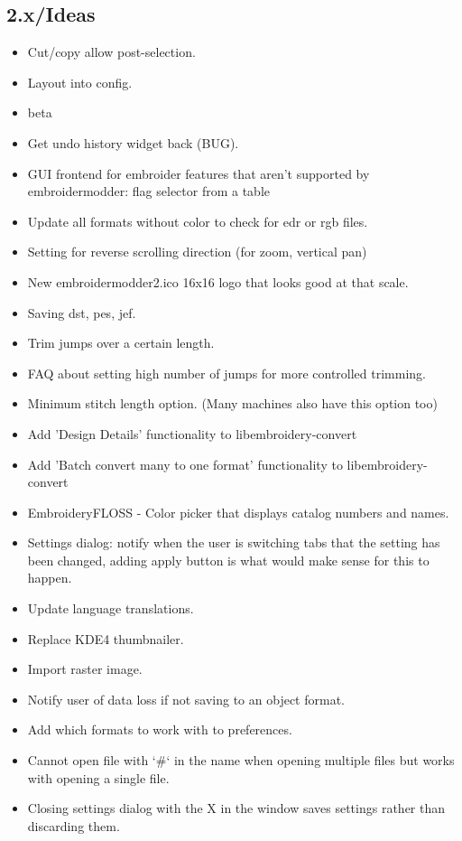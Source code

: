 \subsection{2.x/Ideas}

\begin{itemize}
\item Cut/copy allow post-selection.
\item Layout into config.
\item beta
\item Get undo history widget back (BUG).
\item GUI frontend for embroider features that aren't supported by embroidermodder: flag selector from a table
\item Update all formats without color to check for edr or rgb files.
\item Setting for reverse scrolling direction (for zoom, vertical pan)
\item New embroidermodder2.ico 16x16 logo that looks good at that scale.
\item Saving dst, pes, jef.
\item Trim jumps over a certain length.
\item FAQ about setting high number of jumps for more controlled trimming.
\item Minimum stitch length option. (Many machines also have this option too)
\item Add 'Design Details' functionality to libembroidery-convert
\item Add 'Batch convert many to one format' functionality to libembroidery-convert
\item EmbroideryFLOSS - Color picker that displays catalog numbers and names.
\item Settings dialog: notify when the user is switching tabs that the setting has been changed, adding apply button is what would make sense for this to happen.
\item Update language translations.
\item Replace KDE4 thumbnailer.
\item Import raster image.
\item Notify user of data loss if not saving to an object format.
\item Add which formats to work with to preferences.
\item Cannot open file with `\#` in the name when opening multiple files but works with opening a single file.
\item Closing settings dialog with the X in the window saves settings rather than discarding them.

\end{itemize}
